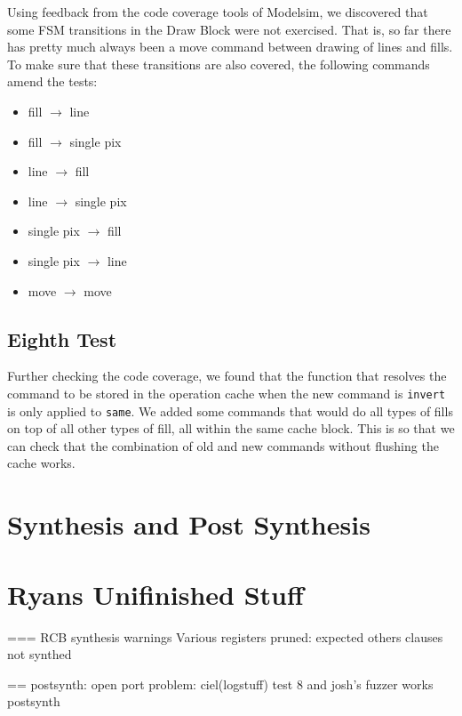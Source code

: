 \documentclass[]{article}
\begin{document}
Using feedback from the code coverage tools of Modelsim, we discovered that some FSM transitions in the Draw Block were not exercised. That is, so far there has pretty much always been a move command between drawing of lines and fills. To make sure that these transitions are also covered, the following commands amend the tests:
\begin{itemize}
	\item fill $\rightarrow$ line
	\item fill $\rightarrow$ single pix
	\item line $\rightarrow$ fill
	\item line $\rightarrow$ single pix
	\item single pix $\rightarrow$ fill
	\item single pix $\rightarrow$ line
	\item move $\rightarrow$ move
\end{itemize}


\subsection{Eighth Test} %
\label{sub:eighth_test}

Further checking the code coverage, we found that the function that resolves the command to be stored in the operation cache when the new command is \verb"invert" is only applied to \verb"same". We added some commands that would do all types of fills on top of all other types of fill, all within the same cache block. This is so that we can check that the combination of old and new commands without flushing the cache works.



\section{Synthesis and Post Synthesis} %
\label{sec:synthesis_and_post_synthesis}




\section{Ryans Unifinished Stuff} %
\label{sec:ryans_unifinished_stuff}

===
RCB synthesis warnings
Various registers pruned: expected
others clauses not synthed


==
postsynth: open port problem: ciel(logstuff)
test 8 and josh's fuzzer works postsynth

\end{document}
